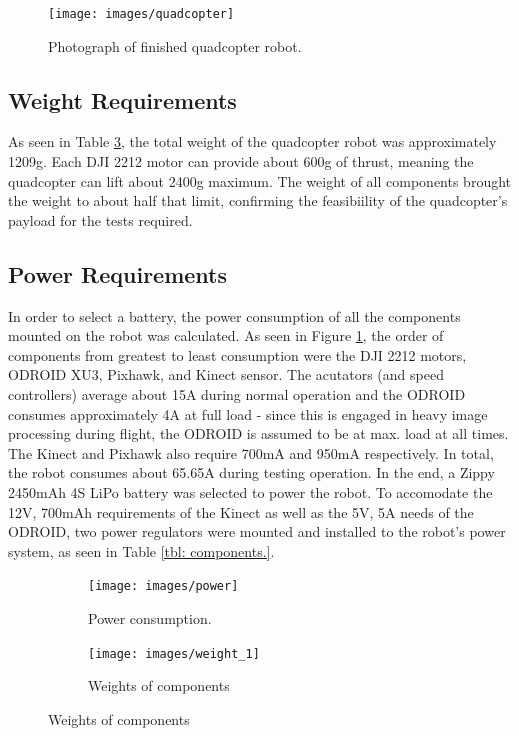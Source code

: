 \documentclass[letterpaper, oneside, 10pt]{report}
\begin{document}
\begin{figure}[h!]
 \caption{Photograph of finished quadcopter robot.}
 \centering
   \texttt{[image: images/quadcopter]}
\end{figure}

\subsection{Weight Requirements}

As seen in Table \ref{fig: weight.}, the total weight of the quadcopter robot was approximately 1209g. Each DJI 2212 motor can provide about 600g of thrust, meaning the quadcopter can lift about 2400g maximum. The weight of all components brought the weight to about half that limit, confirming the feasibiility of the quadcopter's payload for the tests required.

\subsection{Power Requirements}

In order to select a battery, the power consumption of all the components mounted on the robot was calculated. As seen in Figure \ref{fig: power.}, the order of components from greatest to least consumption were the DJI 2212 motors, ODROID XU3, Pixhawk, and Kinect sensor. The acutators (and speed controllers) average about 15A during normal operation and the ODROID consumes approximately 4A at full load - since this is engaged in heavy image processing during flight, the ODROID is assumed to be at max. load at all times. The Kinect and Pixhawk also require 700mA and 950mA respectively. In total, the robot consumes about 65.65A during testing operation. In the end, a Zippy 2450mAh 4S LiPo battery was selected to power the robot. To accomodate the 12V, 700mAh requirements of the Kinect as well as the 5V, 5A needs of the ODROID, two power regulators were mounted and installed to the robot's power system, as seen in Table \ref{tbl: components.}.

\begin{figure}[h]
    \centering
    \begin{subfigure}[h]{0.4\textwidth}
        \centering
        \texttt{[image: images/power]}
        \caption{Power consumption.}
        \label{fig: power.}
    \end{subfigure}
    \hfill
    \begin{subfigure}[h]{0.4\textwidth}
        \centering
        \texttt{[image: images/weight\_1]}
        \caption{Weights of components}
        \label{fig: weight.}
    \end{subfigure}
\end{figure}
\end{document}
